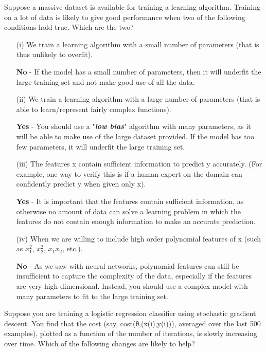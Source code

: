 \documentclass[11pt]{article} %
\begin{document}
Suppose a massive dataset is available for training a learning algorithm. Training on a lot of data is likely to give good performance when two of the following conditions hold true. Which are the two?
\begin{itemize}
	\item[(i)] We train a learning algorithm with a small number of parameters (that is thus unlikely to overfit).	
	
	\textbf{No} - If the model has a small number of parameters, then it will underfit the large training set and not make good use of all the data.
	\item[(ii)] We train a learning algorithm with a large number of parameters (that is able to learn/represent fairly complex functions).	
	
	\textbf{Yes} - You should use a "\textit{\textbf{low bias}}" algorithm with many parameters, as it will be able to make use of the large dataset provided. If the model has too few parameters, it will underfit the large training set.
	\item[(iii)] The features x contain sufficient information to predict y accurately. (For example, one way to verify this is if a human expert on the domain can confidently predict y when given only x).	
	
	\textbf{Yes} - It is important that the features contain sufficient information, as otherwise no amount of data can solve a learning problem in which the features do not contain enough information to make an accurate prediction.
	\item[(iv)]When we are willing to include high order polynomial features of x (such as $x^2_1$, $x^2_2$, $x_1x_2$, etc.).	
	
	\textbf{No} - As we saw with neural networks, polynomial features can still be insufficient to capture the complexity of the data, especially if the features are very high-dimensional. Instead, you should use a complex model with many parameters to fit to the large training set.
	
\end{itemize}
\newpage



Suppose you are training a logistic regression classifier using stochastic gradient descent. You find that the cost (say, cost(θ,(x(i),y(i))), averaged over the last 500 examples), plotted as a function of the number of iterations, is slowly increasing over time. Which of the following changes are likely to help?
\end{document}

